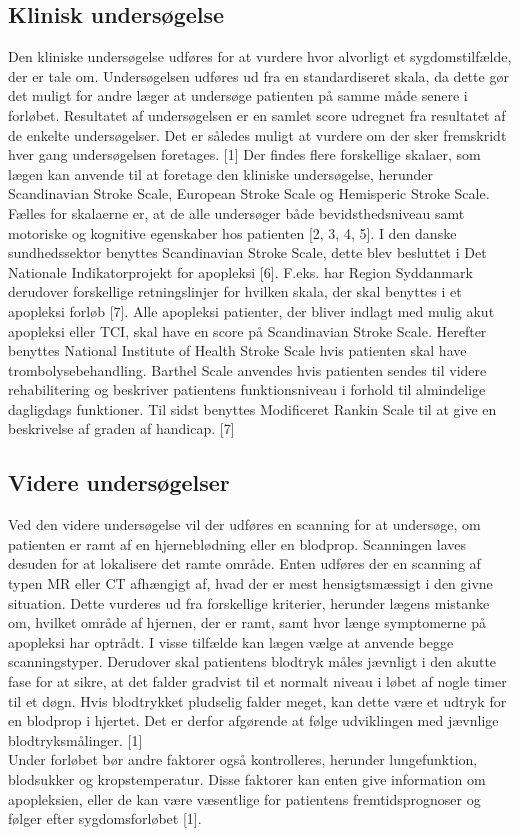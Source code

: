 \subsection{Klinisk undersøgelse}
Den kliniske undersøgelse udføres for at vurdere hvor alvorligt et sygdomstilfælde, der er tale om. Undersøgelsen udføres ud fra en standardiseret skala, da dette gør det muligt for andre læger at undersøge patienten på samme måde senere i forløbet. Resultatet af undersøgelsen er en samlet score udregnet fra resultatet af de enkelte undersøgelser. Det er således muligt at vurdere om der sker fremskridt hver gang undersøgelsen foretages. [1]
Der findes flere forskellige skalaer, som lægen kan anvende til at foretage den kliniske undersøgelse, herunder Scandinavian Stroke Scale, European Stroke Scale og Hemisperic Stroke Scale. Fælles for skalaerne er, at de alle undersøger både bevidsthedsniveau samt motoriske og kognitive egenskaber hos patienten [2, 3, 4, 5]. I den danske sundhedssektor benyttes Scandinavian Stroke Scale, dette blev besluttet i Det Nationale Indikatorprojekt for apopleksi [6]. F.eks. har Region Syddanmark derudover forskellige retningslinjer for hvilken skala, der skal benyttes i et apopleksi forløb [7]. Alle apopleksi patienter, der bliver indlagt med mulig akut apopleksi eller TCI, skal have en score på Scandinavian Stroke Scale. Herefter benyttes National Institute of Health Stroke Scale hvis patienten skal have trombolysebehandling. Barthel Scale anvendes hvis patienten sendes til videre rehabilitering og beskriver patientens funktionsniveau i forhold til almindelige dagligdags funktioner. Til sidst benyttes Modificeret Rankin Scale til at give en beskrivelse af graden af handicap. [7]

\subsection{Videre undersøgelser}
Ved den videre undersøgelse vil der udføres en scanning for at undersøge, om patienten er ramt af en hjerneblødning  eller en blodprop. Scanningen laves desuden for at lokalisere det ramte område. Enten udføres der en scanning af typen MR eller CT afhængigt af, hvad der er mest hensigtsmæssigt i den givne situation. Dette vurderes ud fra forskellige kriterier, herunder lægens mistanke om, hvilket område af hjernen, der er ramt, samt hvor længe symptomerne på apopleksi har optrådt. I visse tilfælde kan lægen vælge at anvende begge scanningstyper.  
Derudover skal patientens blodtryk måles jævnligt i den akutte fase for at sikre, at det falder gradvist til et normalt niveau i løbet af nogle timer til et døgn. Hvis blodtrykket pludselig falder meget, kan dette være et udtryk for en blodprop i hjertet. Det er derfor afgørende at følge udviklingen med jævnlige blodtryksmålinger. [1]
\\
Under forløbet bør andre faktorer også kontrolleres, herunder lungefunktion, blodsukker og kropstemperatur. Disse faktorer kan enten give information om apopleksien, eller de kan være væsentlige for patientens fremtidsprognoser og følger efter sygdomsforløbet [1].
\\

